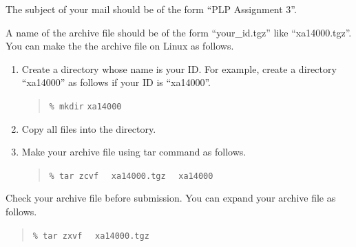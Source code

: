 \documentclass{article}
\begin{document}
The subject of your mail should be of the form ``PLP Assignment 3''.

A name of the archive file should be of the form ``your\_id.tgz'' like ``xa14000.tgz''.
You can make the the archive file on Linux as follows.
\begin{enumerate}
 \item Create a directory whose name is your ID.
       For example, create a directory ``xa14000'' as follows if your ID is ``xa14000''.
       \begin{quote}
	{\tt \% mkdir} {\tt xa14000} 
       \end{quote}

 \item Copy all files into the directory.
 \item Make your archive file using tar command as follows.
       \begin{quote}
	{\tt \% tar zcvf} \ \ {\tt xa14000}{\tt .tgz} \ \ {\tt xa14000}
       \end{quote}
\end{enumerate}

Check your archive file before submission. You can expand your archive
file as follows.
\begin{quote}
 {\tt \% tar zxvf} \ \ {\tt xa14000}{\tt .tgz}
\end{quote}


\fi
\end{document}
